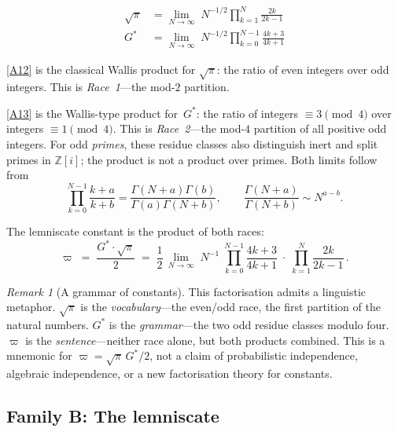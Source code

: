 \documentclass[12pt,reqno]{amsart}
\theoremstyle{definition}
\theoremstyle{remark}
\newtheorem{remark}[theorem]{Remark}
\newcommand{\ZZ}{\mathbb{Z}}
\newcommand{\Gstar}{G^{\!*}}
\newcommand{\varpiup}{\varpi}
\begin{document}
\begin{align}
  \sqrt{\pi} &= \lim_{N\to\infty}\; N^{-1/2}
    \prod_{k=1}^{N}\frac{2k}{2k-1}
    \tag{A12}\label{A12}\\[5pt]
  {\Gstar} &= \lim_{N\to\infty}\; N^{-1/2}
    \prod_{k=0}^{N-1}\frac{4k+3}{4k+1}
    \tag{A13}\label{A13}
\end{align}

\noindent
\eqref{A12} is the classical Wallis product for $\sqrt{\pi}$: the ratio
of even integers over odd integers.  This is \emph{Race~1}---the mod-$2$
partition.

\eqref{A13} is the Wallis-type product for~${\Gstar}$: the ratio
of integers $\equiv 3\pmod{4}$ over integers $\equiv 1\pmod{4}$.
This is \emph{Race~2}---the mod-$4$ partition of all positive odd integers.
For odd \emph{primes}, these residue classes also distinguish inert
and split primes in $\ZZ[i]$; the product is not a product over primes.
Both limits follow from
\[
 \prod_{k=0}^{N-1}\frac{k+a}{k+b}
 =\frac{\Gamma(N+a)\Gamma(b)}{\Gamma(a)\Gamma(N+b)},\qquad
 \frac{\Gamma(N+a)}{\Gamma(N+b)}\sim N^{a-b}.
\]

The lemniscate constant is the product of both races:
\begin{equation}\tag{A14}\label{A14}
  \varpiup \;=\; \frac{{\Gstar}\cdot\sqrt{\pi}}{2}
  \;=\; \frac{1}{2}\,\lim_{N\to\infty}\;N^{-1}\;
  \prod_{k=0}^{N-1}\frac{4k+3}{4k+1}\;\cdot\;
  \prod_{k=1}^{N}\frac{2k}{2k-1}\,.
\end{equation}

\begin{remark}[A grammar of constants]\label{rem:grammar}
This factorisation admits a linguistic metaphor.
$\sqrt{\pi}$ is the \emph{vocabulary}---the even/odd race, the first
partition of the natural numbers.
${\Gstar}$ is the \emph{grammar}---the two odd residue classes modulo four.
$\varpiup$ is the \emph{sentence}---neither race alone,
but both products combined. This is a mnemonic for
$\varpiup=\sqrt\pi\,\Gstar/2$, not a claim of probabilistic independence,
algebraic independence, or a new factorisation theory for constants.
\end{remark}

\subsection{Family B: The lemniscate}\label{sec:B}
\end{document}
